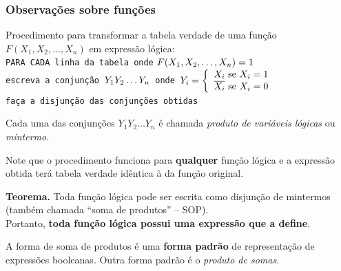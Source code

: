 \documentclass{beamer}
\newcommand{\comment}[1]{{\color{structure.fg!70!white}\footnotesize #1}}
\begin{document}

\begin{frame}[fragile]
 \frametitle{Observações sobre funções}

\small
%
 Procedimento para transformar a tabela verdade de uma função
$F(X_1, X_2, \ldots, X_n)$ em expressão lógica:\\[6pt]

\texttt{PARA CADA linha da tabela onde} \(F(X\sb{1}, X\sb{2}, \ldots, X\sb{n})=1\)\\
\hspace{4ex}\texttt{escreva a conjunção \(Y\sb{1}Y\sb{2} \ldots Y\sb{n}\) onde \(Y\sb{i}=\left\{\begin{array}{l}X\sb{i} \text{ se } X\sb{i}=1\\{}\overline{X\sb{i}} \text{ se } X\sb{i}=0\end{array}\right.\)}\\
\texttt{faça a disjunção das conjunções obtidas}\\[6pt]

\pause

Cada uma das conjunções $Y_{1} Y_{2} \ldots Y_{n}$ é chamada \emph{produto de variáveis lógicas} ou \emph{mintermo}.

\vspace{6pt}

Note que o procedimento funciona para \textbf{qualquer} função lógica e a
expressão obtida terá tabela verdade idêntica à da função original.

\pause

\vspace{6pt}

\textbf{Teorema.} Toda função lógica pode ser escrita como disjunção de mintermos (também chamada ``soma de produtos'' -- SOP).\\
Portanto, \textbf{toda função lógica possui uma expressão que a define}.

\pause

\vspace{6pt}

A forma de soma de produtos é uma \textbf{forma padrão} de representação de expressões booleanas. \comment{Outra forma padrão é o \emph{produto de somas}.}

\end{frame}
\end{document}
